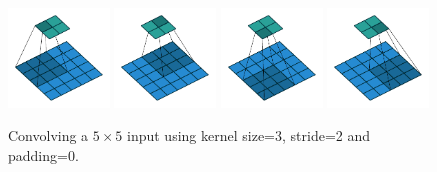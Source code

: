 \documentclass{article}
\begin{document}
\begin{figure}[H]
    \centering
    \includegraphics[width=0.24\textwidth]{pdf/no_padding_strides_00.pdf}
    \includegraphics[width=0.24\textwidth]{pdf/no_padding_strides_01.pdf}
    \includegraphics[width=0.24\textwidth]{pdf/no_padding_strides_02.pdf}
    \includegraphics[width=0.24\textwidth]{pdf/no_padding_strides_03.pdf}
    \caption{\label{fig:no_padding_strides} 
        Convolving a $5 \times 5$ input using kernel size=3, stride=2 and padding=0.}
\end{figure}
\end{document}
